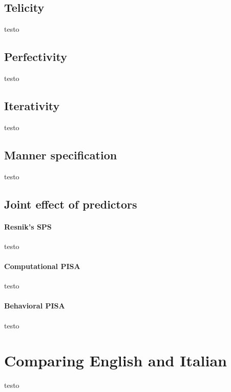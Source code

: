 \subsection{Telicity} 

testo

\subsection{Perfectivity} 

testo

\subsection{Iterativity}

testo

\subsection{Manner specification} 

testo

\subsection{Joint effect of predictors} 



\paragraph{Resnik's SPS} testo

\paragraph{Computational PISA} testo

\paragraph{Behavioral PISA} testo



\section{Comparing English and Italian} 

testo


